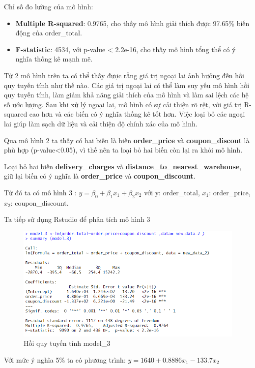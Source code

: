 Chỉ số đo lường của mô hình:

\begin{itemize}
\item\textbf{Multiple R-squared}: 0.9765, cho thấy mô hình giải thích được 97.65\% biến động của order\_total.
\item\textbf{F-statistic}: 4534, với p-value < 2.2e-16, cho thấy mô hình tổng thể có ý nghĩa thống kê mạnh mẽ.
\end{itemize}

Từ 2 mô hình trên ta có thể thấy được rằng giá trị ngoại lai ảnh hưởng đến hồi quy tuyến tính như thế nào. Các giá trị ngoại lai có thể làm suy yếu mô hình hồi quy tuyến tính, làm giảm khả năng giải thích của mô hình và làm sai lệch các hệ số ước lượng. Sau khi xử lý ngoại lai, mô hình có sự cải thiện rõ rệt, với giá trị R-squared cao hơn và các biến có ý nghĩa thống kê tốt hơn. Việc loại bỏ các ngoại lai giúp làm sạch dữ liệu và cải thiện độ chính xác của mô hình.

Qua mô hình 2 ta thấy có hai biến là biến \textbf{order\_price} và \textbf{coupon\_discout} là phù hợp (p-value<0.05), vì thế nên ta loại bỏ hai biến còn lại ra khỏi mô hình.

Loại bỏ hai biến \textbf{delivery\_charges} và \textbf{distance\_to\_nearest\_warehouse}, giữ lại biến có ý nghĩa là \textbf{order\_price} và \textbf{coupon\_discount}.

Từ đó ta có mô hình 3 : $y= \beta_0 + \beta_1x_1 + \beta_2x_2$ với y: order\_total, $x_1$: order\_price, $x_2$: coupon\_discount.

Ta tiếp sử dụng Rstudio để phân tích mô hình 3
\begin{figure}[ht]
  \centering
  \includegraphics[width=0.7\linewidth]{graphics/5.5.4.png}
  \caption{Hồi quy tuyến tính model\_3 }
\end{figure}

Với mức ý nghĩa 5\% ta có phương trình: $y= 1640 + 0.8886x_1 - 133.7 x_2$

